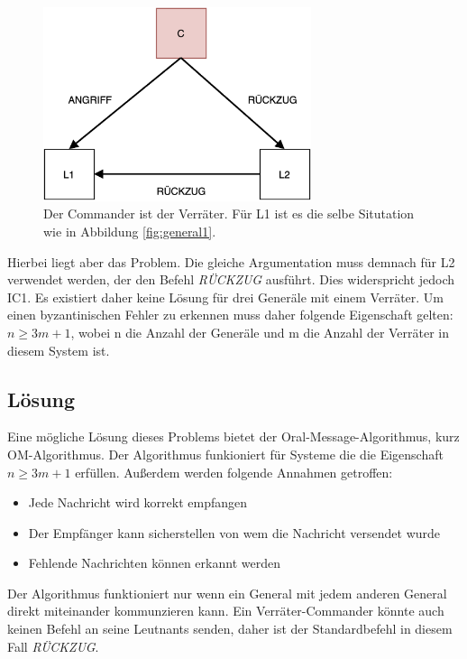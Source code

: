 \documentclass{article}
\begin{document}
\begin{figure}[H]
    \centering
    \includegraphics[width=0.7\textwidth]{general2.png}
    \caption{Der Commander ist der Verräter. Für L1 ist es die selbe Situtation wie in Abbildung \ref{fig:general1}.}
    \label{fig:general2}
\end{figure}

Hierbei liegt aber das Problem. Die gleiche Argumentation muss demnach für L2
verwendet werden, der den Befehl \textit{RÜCKZUG} ausführt. Dies widerspricht jedoch 
IC1. Es existiert daher keine Lösung für drei Generäle mit einem Verräter. 
Um einen byzantinischen Fehler zu erkennen muss daher folgende Eigenschaft gelten: $n \geq 3m + 1$, 
wobei n die Anzahl der Generäle und m die Anzahl der Verräter in diesem System ist.

\subsection{Lösung}

Eine mögliche Lösung dieses Problems bietet der Oral-Message-Algorithmus, kurz OM-Algorithmus. Der
Algorithmus funkioniert für Systeme die die Eigenschaft $n \geq 3m + 1$ erfüllen. Außerdem werden 
folgende Annahmen getroffen: \\

\begin{itemize}
    \item Jede Nachricht wird korrekt empfangen 
    \item Der Empfänger kann sicherstellen von wem die Nachricht versendet wurde 
    \item Fehlende Nachrichten können erkannt werden
\end{itemize}

Der Algorithmus funktioniert nur wenn ein General mit jedem anderen General 
direkt miteinander kommunzieren kann. Ein Verräter-Commander könnte auch 
keinen Befehl an seine Leutnants senden, daher ist der Standardbefehl in diesem 
Fall \textit{RÜCKZUG}.
\end{document}
